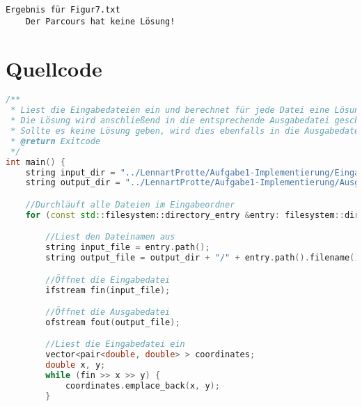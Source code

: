 \documentclass[a4paper,10pt,ngerman]{scrartcl}
\begin{document}
    \begin{lstlisting}[frame=single, title=Programmausgabe Figur 7., breaklines=true,label={lst:lstlisting4}]
  Ergebnis für Figur7.txt
    Der Parcours hat keine Lösung!
    \end{lstlisting}
    
    \newpage
    \section{Quellcode}
    \label{sec:quellcode}
    \label{LastPage}
    \begin{lstlisting}[frame=single,language=C++,title=Methode main,breaklines=true,label={lst:code_main}]
/**
 * Liest die Eingabedateien ein und berechnet für jede Datei eine Lösung entsprechend der Aufgabenstellung.
 * Die Lösung wird anschließend in die entsprechende Ausgabedatei geschrieben.
 * Sollte es keine Lösung geben, wird dies ebenfalls in die Ausgabedatei geschrieben.
 * @return Exitcode
 */
int main() {
    string input_dir = "../LennartProtte/Aufgabe1-Implementierung/Eingabedateien";
    string output_dir = "../LennartProtte/Aufgabe1-Implementierung/Ausgabedateien";

    //Durchläuft alle Dateien im Eingabeordner
    for (const std::filesystem::directory_entry &entry: filesystem::directory_iterator(input_dir)) {

        //Liest den Dateinamen aus
        string input_file = entry.path();
        string output_file = output_dir + "/" + entry.path().filename().string();

        //Öffnet die Eingabedatei
        ifstream fin(input_file);

        //Öffnet die Ausgabedatei
        ofstream fout(output_file);

        //Liest die Eingabedatei ein
        vector<pair<double, double> > coordinates;
        double x, y;
        while (fin >> x >> y) {
            coordinates.emplace_back(x, y);
        }


\end{lstlisting}
\end{document}
